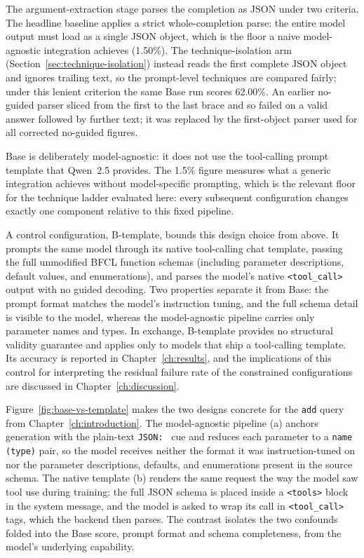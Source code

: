 The argument-extraction stage parses the completion as JSON under two
criteria. The headline baseline applies a strict whole-completion parse: the
entire model output must load as a single JSON object, which is the floor a
naive model-agnostic integration achieves (1.50\%). The technique-isolation
arm (Section~\ref{sec:technique-isolation}) instead reads the first complete
JSON object and ignores trailing text, so the prompt-level techniques are
compared fairly; under this lenient criterion the same Base run scores
62.00\%. An earlier no-guided parser sliced from the first to the last brace
and so failed on a valid answer followed by further text; it was replaced by
the first-object parser used for all corrected no-guided figures.

Base is deliberately model-agnostic: it does not use the
tool-calling prompt template that Qwen~2.5 provides. The 1.5\% figure
measures what a generic integration achieves without model-specific
prompting, which is the relevant floor for the technique ladder
evaluated here: every subsequent configuration changes exactly one
component relative to this fixed pipeline.

A control configuration, B-template, bounds this design choice from
above. It prompts the same model through its native tool-calling
chat template, passing the full unmodified BFCL function schemas
(including parameter descriptions, default values, and
enumerations), and parses the model's native \texttt{<tool\_call>}
output with no guided decoding. Two properties separate it from Base:
the prompt format matches the model's instruction tuning, and the
full schema detail is visible to the model, whereas the
model-agnostic pipeline carries only parameter names and types. In
exchange, B-template provides no structural validity guarantee and
applies only to models that ship a tool-calling template. Its accuracy
is reported in Chapter~\ref{ch:results}, and the implications of this
control for interpreting the residual failure rate of the constrained
configurations are discussed in Chapter~\ref{ch:discussion}.

Figure~\ref{fig:base-vs-template} makes the two designs concrete for the
\texttt{add} query from Chapter~\ref{ch:introduction}. The model-agnostic
pipeline (a) anchors generation with the plain-text \texttt{JSON:~} cue and
reduces each parameter to a \texttt{name (type)} pair, so the model receives
neither the format it was instruction-tuned on nor the parameter descriptions,
defaults, and enumerations present in the source schema. The native template
(b) renders the same request the way the model saw tool use during training:
the full JSON schema is placed inside a \texttt{<tools>} block in the system
message, and the model is asked to wrap its call in \texttt{<tool\_call>} tags,
which the backend then parses. The contrast isolates the two confounds folded
into the Base score, prompt format and schema completeness, from the model's
underlying capability.

